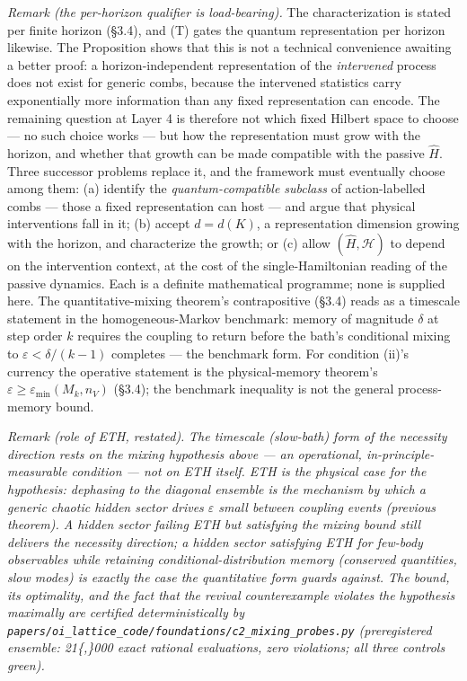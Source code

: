 \documentclass[
]{article}
\begin{document}
\emph{Remark (the per-horizon qualifier is load-bearing).} The
characterization is stated per finite horizon (§3.4), and (T) gates the
quantum representation per horizon likewise. The Proposition shows that
this is not a technical convenience awaiting a better proof: a
horizon-independent representation of the \emph{intervened} process does
not exist for generic combs, because the intervened statistics carry
exponentially more information than any fixed representation can encode.
The remaining question at Layer 4 is therefore not which fixed Hilbert
space to choose --- no such choice works --- but how the representation
must grow with the horizon, and whether that growth can be made
compatible with the passive \(\hat{H}\). Three successor problems
replace it, and the framework must eventually choose among them: (a)
identify the \emph{quantum-compatible subclass} of action-labelled combs
--- those a fixed representation can host --- and argue that physical
interventions fall in it; (b) accept \(d = d(K)\), a representation
dimension growing with the horizon, and characterize the growth; or (c)
allow \((\hat{H}, \mathcal{H})\) to depend on the intervention context,
at the cost of the single-Hamiltonian reading of the passive dynamics.
Each is a definite mathematical programme; none is supplied here. The
quantitative-mixing theorem's contrapositive (§3.4) reads as a timescale
statement in the homogeneous-Markov benchmark: memory of magnitude
\(\delta\) at step order \(k\) requires the coupling to return before
the bath's conditional mixing to \(\varepsilon < \delta/(k-1)\)
completes --- the benchmark form. For condition (ii)'s currency the
operative statement is the physical-memory theorem's
\(\varepsilon \geq \varepsilon_{\min}(M_k, n_V)\) (§3.4); the benchmark
inequality is not the general process-memory bound.

\emph{Remark (role of ETH, restated).} \emph{The timescale (slow-bath)
form of the necessity direction rests on the mixing hypothesis above ---
an operational, in-principle-measurable condition --- not on ETH itself.
ETH is the physical case for the hypothesis: dephasing to the diagonal
ensemble is the mechanism by which a generic chaotic hidden sector
drives \(\varepsilon\) small between coupling events (previous theorem).
A hidden sector failing ETH but satisfying the mixing bound still
delivers the necessity direction; a hidden sector satisfying ETH for
few-body observables while retaining conditional-distribution memory
(conserved quantities, slow modes) is exactly the case the quantitative
form guards against. The bound, its optimality, and the fact that the
revival counterexample violates the hypothesis maximally are certified
deterministically by
\texttt{papers/oi\_lattice\_code/foundations/c2\_mixing\_probes.py}
(preregistered ensemble: 21\{,\}000 exact rational evaluations, zero
violations; all three controls green).}
\end{document}
